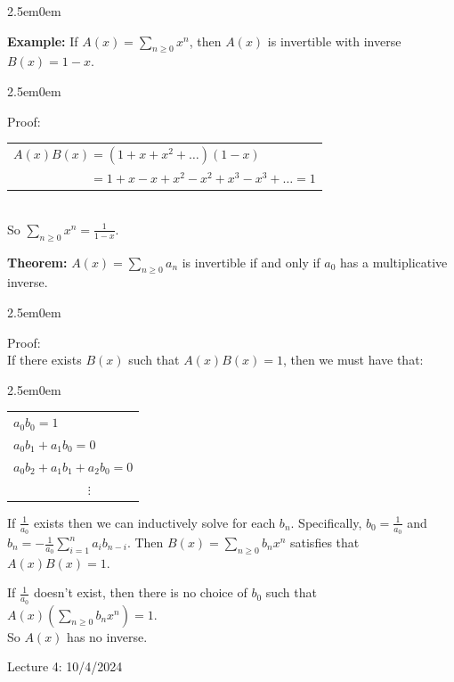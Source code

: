\documentclass{book}
\newcommand{\hTwo}{%
\color{MidnightBlue}%
   \fontsize{13}{15}\selectfont%
}
\newcommand{\hThree}{%
   \color{PineGreen!85!Orange}
   \fontsize{12}{14}\selectfont%
}
\newenvironment{myIndent}{%
   \begin{adjustwidth}{2.5em}{0em}%
}{%
   \end{adjustwidth}%
}
\newcommand{\blab}[1]{\textbf{#1}}
\newcommand{\retTwo}{\hfill\bigbreak}
\newcommand{\mHeader}[1]{{
   \color{Black}%
   \fontsize{20}{18}\selectfont%
   #1\retTwo
}}
\begin{document}
\begin{myIndent}\hTwo
   \blab{Example:} If $A(x) = \sum\limits_{n \geq 0} x^n$, then $A(x)$ is invertible with inverse $B(x) = 1 - x$.

   \begin{myIndent}\hThree
      Proof:\\ [-10pt]

      \begin{tabular}{l}
         $A(x)B(x) = (1 + x +x^2 + \ldots)(1 - x)$ \\ $\phantom{A(x)B(x)} = 1 + x - x + x^2 - x^2 + x^3 - x^3 + \ldots = 1$
      \end{tabular}\\

      So $\sum\limits_{n \geq 0} x^n = \frac{1}{1 - x}$.\retTwo
   \end{myIndent}

   \blab{Theorem:} $A(x) = \sum\limits_{n \geq 0}a_n$ is invertible if and only if $a_0$ has a multiplicative inverse.
   
   \begin{myIndent}\hThree
      Proof:\\
      If there exists $B(x)$ such that $A(x)B(x) = 1$, then we must have that:
      \begin{myIndent}
         \begin{tabular}{l}
            $a_0 b_0 = 1$ \\
            $a_0 b_1 + a_1 b_0 = 0$ \\
            $a_0 b_2 + a_1 b_1 + a_2 b_0 = 0$ \\
            $\phantom{a_0b_2 + a_1b_1 +} \vdots $
         \end{tabular}\newpage
      \end{myIndent}

      If $\frac{1}{a_0}$ exists then we can inductively solve for each $b_n$. Specifically, $b_0 = \frac{1}{a_0}$ and\\ [-3pt] $b_n = -\frac{1}{a_0}\sum\limits_{i=1}^n a_i b_{n - i}$. Then $B(x) = \sum\limits_{n \geq 0}b_n x^n$ satisfies that $A(x)B(x) = 1$.\retTwo

      If $\frac{1}{a_0}$ doesn't exist, then there is no choice of $b_0$ such that $A(x) (\sum\limits_{n \geq 0}b_n x^n) = 1$.\\ [-6pt] So $A(x)$ has no inverse.\retTwo
   \end{myIndent}
\end{myIndent}

\mHeader{Lecture 4: 10/4/2024}
\end{document}

